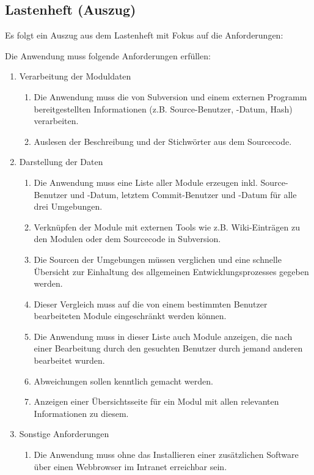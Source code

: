 \subsection{Lastenheft (Auszug)}
\label{app:Lastenheft}
Es folgt ein Auszug aus dem Lastenheft mit Fokus auf die Anforderungen:

Die Anwendung muss folgende Anforderungen erfüllen: 
\begin{enumerate}[itemsep=0em,partopsep=0em,parsep=0em,topsep=0em]
\item Verarbeitung der Moduldaten
	\begin{enumerate}
	\item Die Anwendung muss die von Subversion und einem externen Programm bereitgestellten Informationen (z.B. Source-Benutzer, -Datum, Hash) verarbeiten.
	\item Auslesen der Beschreibung und der Stichwörter aus dem Sourcecode.
	\end{enumerate}
\item Darstellung der Daten
	\begin{enumerate}
	\item Die Anwendung muss eine Liste aller Module erzeugen inkl. Source-Benutzer und -Datum, letztem Commit-Benutzer und -Datum für alle drei Umgebungen. 
	\item Verknüpfen der Module mit externen Tools wie z.B. Wiki-Einträgen zu den Modulen oder dem Sourcecode in Subversion.
	\item Die Sourcen der Umgebungen müssen verglichen und eine schnelle Übersicht zur Einhaltung des allgemeinen Entwicklungsprozesses gegeben werden. 
	\item Dieser Vergleich muss auf die von einem bestimmten Benutzer bearbeiteten Module eingeschränkt werden können. 
	\item Die Anwendung muss in dieser Liste auch Module anzeigen, die nach einer Bearbeitung durch den gesuchten Benutzer durch jemand anderen bearbeitet wurden. 
	\item Abweichungen sollen kenntlich gemacht werden. 
	\item Anzeigen einer Übersichtsseite für ein Modul mit allen relevanten Informationen zu diesem.
	\end{enumerate}
\item Sonstige Anforderungen
	\begin{enumerate}
	\item Die Anwendung muss ohne das Installieren einer zusätzlichen Software über einen Webbrowser im Intranet erreichbar sein.

\end{enumerate}
\end{enumerate}

